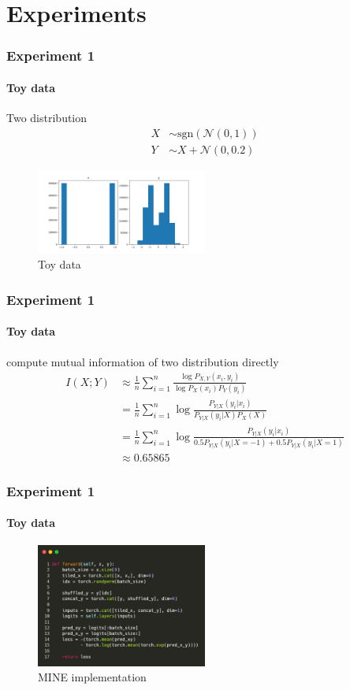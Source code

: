 \documentclass[aspectratio=169]{beamer}
\begin{document}
\section{Experiments}
\begin{frame}
	\frametitle{Experiment 1}
	\framesubtitle{Toy data}
	Two distribution
	\begin{align*}
		X &\sim \text{sgn}(\mathcal{N}(0,1)) \\
		Y &\sim X+\mathcal{N}(0, 0.2)
	\end{align*}
	\begin{figure}
		\centering
		\includegraphics[width=0.5\textwidth]{./images/toy_data.png}
		\caption{Toy data}
		\label{fig:toy_data}
	\end{figure}
\end{frame}

\begin{frame}
	\frametitle{Experiment 1}
	\framesubtitle{Toy data}
	compute mutual information of two distribution directly
	\begin{align*}
		I(X;Y)	&\approx \frac{1}{n} \sum_{i=1}^n \frac{\log{P_{X,Y}(x_i, y_i)}}{\log{P_X(x_i)}{P_Y(y_i)}} \\
		& = \frac{1}{n} \sum_{i=1}^n \log{\frac{{P_{Y|X}(y_i|x_i)}}{{P_{Y|X}(y_i|X)}{P_X(X)}}} \\
		& = \frac{1}{n} \sum_{i=1}^n \log{\frac{{P_{Y|X}(y_i|x_i)}}{{0.5 P_{Y|X}(y_i|X = -1)} + {0.5 P_{Y|X}(y_i|X = 1)}}} \\
		&\approx 0.65865
	\end{align*}
\end{frame}

\begin{frame}
	\frametitle{Experiment 1}
	\framesubtitle{Toy data}
	\begin{figure}
		\centering
		\includegraphics[width=0.5\textwidth]{./images/mine_implementation.png}
		\caption{MINE implementation}
		\label{fig:mine_implementation}
	\end{figure}
\end{frame}
\end{document}
